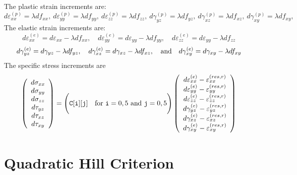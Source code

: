 \documentclass[11pt]{book}
\def\code#1{{\small\tt #1}}
\def\err#1{\varepsilon_{#1}^{(res,r)}}
\def\fvvec#1#2#3#4#5#6{\left(\begin{array}{ccc} #1 \\ #2 \\ #3 \\ #4 \\ #5 \\ #6 \end{array}\right)}
\def\g#1{\gamma_{#1}}
\def\s#1{\sigma_{#1}}
\def\t#1{\tau_{#1}}
\begin{document}
 The plastic strain increments are:
\begin{equation}
       d\varepsilon_{xx}^{(p)} = \lambda df_{xx}, \ 
       d\varepsilon_{yy}^{(p)} = \lambda df_{yy}, \ 
       d\varepsilon_{zz}^{(p)} = \lambda df_{zz}, \ 
       d\gamma_{yz}^{(p)} =  \lambda df_{yz}, \ 
       d\gamma_{xz}^{(p)} =  \lambda df_{xz}, \ 
       d\gamma_{xy}^{(p)} =  \lambda df_{xy},
\end{equation}
The elastic strain increments are:
\begin{equation}
       d\varepsilon_{xx}^{(e)} = d\varepsilon_{xx} -\lambda df_{xx}, \quad
       d\varepsilon_{yy}^{(e)} = d\varepsilon_{yy} -\lambda df_{yy}, \quad
       d\varepsilon_{zz}^{(e)} =  d\varepsilon_{yy} -\lambda df_{zz}
\end{equation}
\begin{equation}
       d\gamma_{yz}^{(e)} = d\gamma_{yz} -  \lambda df_{yz}, \quad 
       d\gamma_{xz}^{(e)} = d\gamma_{xz} -  \lambda df_{xz}, \quad  {\rm and} \quad
       d\gamma_{xy}^{(e)} = d\gamma_{xy} -  \lambda df_{xy}
\end{equation}
The specific stress increments are
\begin{equation}
      \fvvec{d\s{xx}}{d\s{yy}}{d\s{zz}}{d\t{yz}}{d\t{xz}}{d\t{xy}} = \Biggl(\code{C[i][j]} \quad {\rm for\ }\code{i}=0,5\ {\rm and\ }\code{j}=0,5\Biggr)
          \fvvec{d\varepsilon_{xx}^{(e)}  - \err{xx}}{d\varepsilon_{yy}^{(e)}  -\err{yy}}{d\varepsilon_{zz}^{(e)}  -\err{zz}}
                             {d\g{yz}^{(e)}-\err{yz}}{d\g{xz}^{(e)}-\err{xz}}{d\g{xy}^{(e)}-\err{xy}}
 \end{equation}

\section{Quadratic Hill Criterion}
\end{document}
